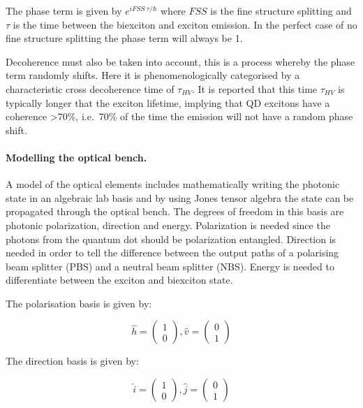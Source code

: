 \documentclass[12pt, twoside]{article}
\numberwithin{equation}{section}
\begin{document}
The phase term is given by $e^{i FSS \ \tau/\hbar}$ where $FSS$ is the
fine structure splitting and $\tau$ is the time between the biexciton
and exciton emission. In the perfect case of no fine structure splitting
the phase term will always be 1.

Decoherence must also be taken into account, this is a process whereby
the phase term randomly shifts. Here it is phenomenologically
categorised by a characteristic cross decoherence time of $\tau_{HV}$.
It is reported that this time $\tau_{HV}$ is typically\cite{hudson}
longer that the exciton lifetime, implying that QD excitons have a
coherence \textgreater 70\%, i.e.~70\% of the time the emission will not
have a random phase shift.

\paragraph{Modelling the optical
bench.}\label{modelling-the-optical-bench.}

A model of the optical elements includes mathematically writing the
photonic state in an algebraic lab basis and by using Jones tensor
algebra\cite{bible, jones} the state can be propagated through the
optical bench. The degrees of freedom in this basis are photonic
polarization, direction and energy. Polarization is needed since the
photons from the quantum dot should be polarization entangled. Direction
is needed in order to tell the difference between the output paths of a
polarising beam splitter (PBS) and a neutral beam splitter (NBS). Energy
is needed to differentiate between the exciton and biexciton state.

The polarisation basis is given by\cite{jones1}:

\begin{equation}
\hat{h} = \begin{pmatrix}1\\0\end{pmatrix}, \hat{v} = \begin{pmatrix}0\\1\end{pmatrix}
\end{equation}

The direction basis is given by:

\begin{equation}
\hat{i} = \begin{pmatrix}1\\0\end{pmatrix}, \hat{j} = \begin{pmatrix}0\\1\end{pmatrix}
\end{equation}
\end{document}
